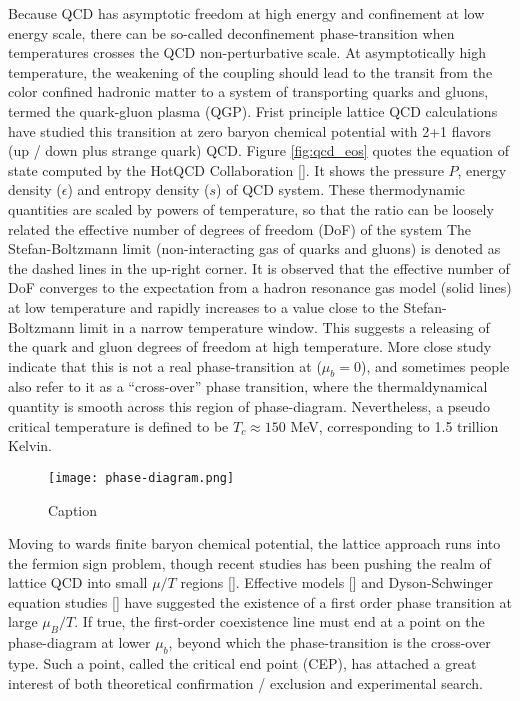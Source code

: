 Because QCD has asymptotic freedom at high energy and confinement at low energy scale, there can be so-called deconfinement phase-transition when temperatures crosses the QCD non-perturbative scale.
At asymptotically high temperature, the weakening of the coupling should lead to the transit from the color confined hadronic matter to a system of transporting quarks and gluons, termed the quark-gluon plasma (QGP). 
Frist principle lattice QCD calculations have studied this transition at zero baryon chemical potential with 2+1 flavors (up / down plus strange quark) QCD.
Figure \ref{fig:qcd_eos} quotes the equation of state computed by  the HotQCD Collaboration [].
It shows the pressure $P$, energy density ($\epsilon$) and entropy density ($s$) of QCD system.
These thermodynamic quantities are scaled by powers of temperature, so that the ratio can be loosely related the effective number of degrees of freedom (DoF) of the system
The Stefan-Boltzmann limit (non-interacting gas of quarks and gluons) is denoted as the dashed lines in the up-right corner.
It is observed that the effective number of DoF converges to the expectation from a hadron resonance gas model (solid lines) at low temperature and rapidly increases to a value close to the Stefan-Boltzmann limit in a narrow temperature window.
This suggests a releasing of the quark and gluon degrees of freedom at high temperature.
More close study indicate that this is not a real phase-transition at ($\mu_b = 0$), and sometimes people also refer to it as a ``cross-over'' phase transition, where the thermaldynamical quantity is smooth across this region of phase-diagram.
Nevertheless, a pseudo critical temperature is defined to be $T_c \approx 150 $ MeV, corresponding to 1.5 trillion Kelvin.

\begin{figure}
    \centering
    \texttt{[image: phase-diagram.png]}
    \caption{Caption}
    \label{fig:phase-diagram}
\end{figure}

Moving to wards finite baryon chemical potential, the lattice approach runs into the fermion sign problem, though recent studies has been pushing the realm of lattice QCD into small $\mu/T$ regions [].
Effective models [] and Dyson-Schwinger equation studies [] have suggested the existence of a first order phase transition at large $\mu_B/T$.
If true, the first-order coexistence line must end at a point on the phase-diagram at lower $\mu_b$, beyond which the phase-transition is the cross-over type.
Such a point, called the critical end point (CEP), has attached a great interest of both theoretical confirmation / exclusion and experimental search.

